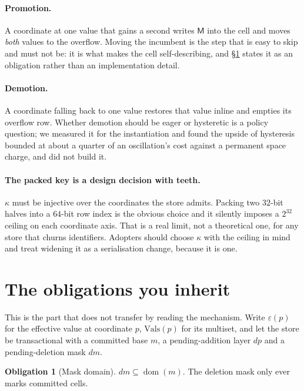 \documentclass[11pt,a4paper]{article}
\theoremstyle{plain}
\theoremstyle{definition}
\newtheorem{invariant}{Obligation}
\theoremstyle{remark}
\newcommand{\M}{\mathsf{M}}
\newcommand{\dom}{\operatorname{dom}}
\begin{document}
\paragraph{Promotion.} A coordinate at one value that gains a second writes
$\M$ into the cell and moves \emph{both} values to the overflow. Moving the
incumbent is the step that is easy to skip and must not be: it is what makes
the cell self-describing, and \S\ref{sec:obligations} states it as an
obligation rather than an implementation detail.

\paragraph{Demotion.} A coordinate falling back to one value restores that
value inline and empties its overflow row. Whether demotion should be eager or
hysteretic is a policy question; we measured it for the instantiation and found
the upside of hysteresis bounded at about a quarter of an oscillation's cost
against a permanent space charge, and did not build it.

\paragraph{The packed key is a design decision with teeth.} $\kappa$ must be
injective over the coordinates the store admits. Packing two $32$-bit halves
into a $64$-bit row index is the obvious choice and it silently imposes a
$2^{32}$ ceiling on each coordinate axis. That is a real limit, not a
theoretical one, for any store that churns identifiers. Adopters should choose
$\kappa$ with the ceiling in mind and treat widening it as a serialisation
change, because it is one.

\section{The obligations you inherit}
\label{sec:obligations}

This is the part that does not transfer by reading the mechanism. Write
$\varepsilon(p)$ for the effective value at coordinate $p$, $\mathrm{Vals}(p)$
for its multiset, and let the store be transactional with a committed base $m$,
a pending-addition layer $dp$ and a pending-deletion mask $dm$.

\begin{invariant}[Mask domain]\label{ob:mask}
$dm \subseteq \dom(m)$. The deletion mask only ever marks committed cells.
\end{invariant}
\end{document}
